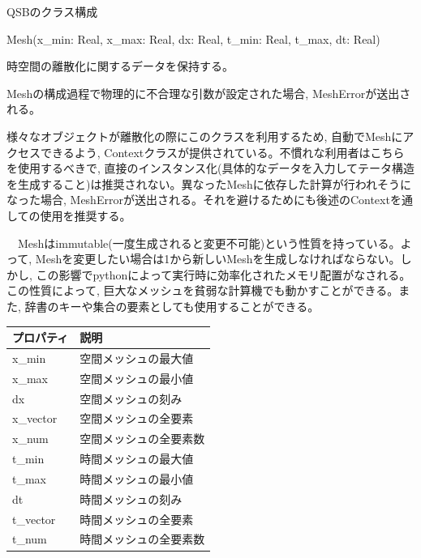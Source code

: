 \documentclass[a4paper, lualatex]{bxjsarticle}
\begin{document}
\begin{section}{QSBのクラス構成\label{AppQ}}
    \begin{subsection}{Mesh(x\_min: Real, x\_max: Real, dx: Real, t\_min: Real, t\_max, dt: Real)}
        \par 時空間の離散化に関するデータを保持する。
        \par Meshの構成過程で物理的に不合理な引数が設定された場合, MeshErrorが送出される。
        \par 様々なオブジェクトが離散化の際にこのクラスを利用するため, 自動でMeshにアクセスできるよう, Contextクラスが提供されている。不慣れな利用者はこちらを使用するべきで, 直接のインスタンス化(具体的なデータを入力してテータ構造を生成すること)は推奨されない。異なったMeshに依存した計算が行われそうになった場合, MeshErrorが送出される。それを避けるためにも後述のContextを通しての使用を推奨する。
        \par　Meshはimmutable(一度生成されると変更不可能)という性質を持っている。よって, Meshを変更したい場合は1から新しいMeshを生成しなければならない。しかし, この影響でpythonによって実行時に効率化されたメモリ配置がなされる。この性質によって, 巨大なメッシュを貧弱な計算機でも動かすことができる。また, 辞書のキーや集合の要素としても使用することができる。 
        \begin{table}[h]
            \begin{tabular}{ll}
                プロパティ & 説明\\ \hline
                x\_min & 空間メッシュの最大値\\
                x\_max & 空間メッシュの最小値\\
                dx & 空間メッシュの刻み\\
                x\_vector & 空間メッシュの全要素\\
                x\_num & 空間メッシュの全要素数\\
                t\_min & 時間メッシュの最大値\\
                t\_max & 時間メッシュの最小値\\
                dt & 時間メッシュの刻み\\
                t\_vector & 時間メッシュの全要素\\
                t\_num & 時間メッシュの全要素数\\
            \end{tabular}
        \end{table}
    \end{subsection}


\end{section}
\end{document}
